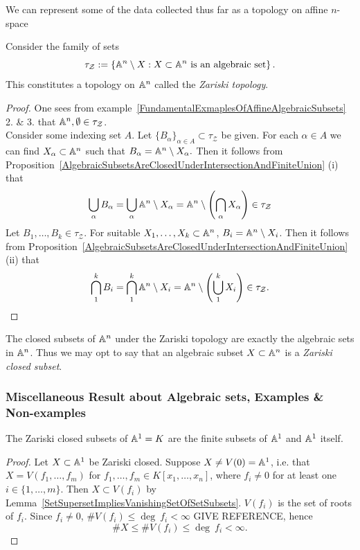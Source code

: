 We can represent some of the data collected thus far as a topology on affine $n$-space
\begin{theorem}
    Consider the family of sets 
    $$\tau_\mathcal{Z} := \left\{ \mathbb{A}^n\setminus X : X\subset \mathbb{A}^n \text{ is an algebraic set} \right\}.$$
    This constitutes a topology on $\mathbb{A}^n$ called the \textit{Zariski topology}. 
\end{theorem}
\begin{proof}
    One sees from example~\ref{FundamentalExmaplesOfAffineAlgebraicSubsets} 2. \& 3. that $\mathbb{A}^n,\emptyset \in \tau_\mathcal{Z}$.\\
    Consider some indexing set $A$. Let $\{B_\alpha\}_{\alpha\in A}\subset \tau_\mathcal{Z}$ be given. For each $\alpha\in A$ we can find $X_\alpha\subset \mathbb{A}^n$ such that $B_\alpha =\mathbb{A}^n\setminus X_\alpha.$ Then it follows from Proposition~\ref{AlgebraicSubsetsAreClosedUnderIntersectionAndFiniteUnion} (i) that
    $$\bigcup_\alpha B_\alpha = \bigcup_\alpha \mathbb{A}^n\setminus X_\alpha = \mathbb{A}^n\setminus \left(\bigcap_\alpha X_\alpha \right) \in \tau_\mathcal{Z}$$
    Let $B_1,\dots,B_k\in \tau_\mathcal{Z}$. For suitable $X_1,\dots,X_k\subset \mathbb{A}^n$, $B_i = \mathbb{A}^n\setminus X_i$. Then it follows from Proposition~\ref{AlgebraicSubsetsAreClosedUnderIntersectionAndFiniteUnion} (ii) that
    $$\bigcap_1^k B_i = \bigcap_1^k \mathbb{A}^n\setminus X_i = \mathbb{A}^n\setminus \left(\bigcup_1^k X_i\right)\in \tau_\mathcal{Z}.$$  
\end{proof}
\begin{remark}
    The closed subsets of $\mathbb{A}^n$ under the Zariski topology are exactly the algebraic sets in $\mathbb{A}^n$. Thus we may opt to say that an algebraic subset $X\subset \mathbb{A}^n$ is a \textit{Zariski closed subset}. 
\end{remark}
\subsubsection{Miscellaneous Result about Algebraic sets, Examples \& Non-examples}
\begin{proposition}\label{AlgebraicSubsetsOfAffine1SpaceAreFiniteSetsAndTheWholeSpace}
    The Zariski closed subsets of $\mathbb{A}^1=K$ are the finite subsets of $\mathbb{A}^1$ and $\mathbb{A}^1$ itself.  
\end{proposition}
\begin{proof}
    Let $X\subset \mathbb{A}^1$ be Zariski closed. Suppose $X\neq V(0)=\mathbb{A}^1$, i.e. that $X = V(f_1,\dots,f_m)$ for $f_1,\dots,f_m\in K[x_1,\dots,x_n]$, where $f_i \neq 0$ for at least one $i\in\{1,\dots,m\}$.  Then $X\subset V(f_i)$ by Lemma~\ref{SetSupersetImpliesVanishingSetOfSetSubsets}.  $V(f_i)$ is the set of roots of $f_i$. Since $f_i\neq 0$, $\# V(f_i) \leq \deg \ f_i < \infty$ {\LARGE GIVE REFERENCE}, hence 
    $$\#X\leq \#V(f_i)\leq \deg \ f_i<\infty.$$
\end{proof}

